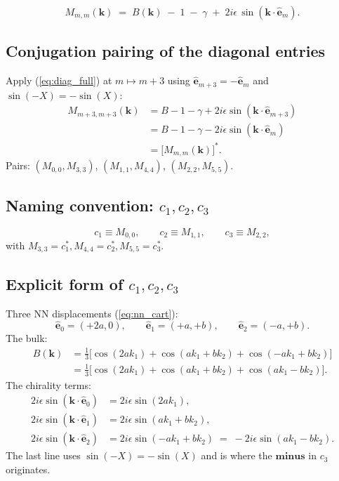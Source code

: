 \documentclass[11pt,a4paper]{article}
\newcommand{\nn}{\nonumber \\}
\newcommand{\vk}{\mathbf{k}}
\newcommand{\veps}[1]{\hat{\mathbf{e}}_{#1}}
\begin{document}
\begin{correctbox}
\begin{equation}\label{eq:diag_full}
M_{m,m}(\vk) \;=\; B(\vk) \;-\; 1 \;-\; \gamma \;+\; 2 i \epsilon \, \sin(\vk \cdot \veps{m}).
\end{equation}
\end{correctbox}

\subsection{Conjugation pairing of the diagonal entries}\label{ssec:conjugation}

Apply (\ref{eq:diag_full}) at $m \mapsto m + 3$ using $\veps{m+3} = -\veps{m}$ and $\sin(-X) = -\sin(X)$:
\begin{align}
M_{m+3, m+3}(\vk) &= B - 1 - \gamma + 2 i \epsilon \sin(\vk \cdot \veps{m+3}) \nn
&= B - 1 - \gamma - 2 i \epsilon \sin(\vk \cdot \veps{m}) \nn
&= \big[M_{m, m}(\vk)\big]^{*}.
\label{eq:conjugation_pair}
\end{align}
Pairs: $(M_{0,0}, M_{3,3})$, $(M_{1,1}, M_{4,4})$, $(M_{2,2}, M_{5,5})$.

\subsection{Naming convention: $c_1, c_2, c_3$}\label{ssec:cnames}
\[
c_1 \equiv M_{0,0}, \qquad c_2 \equiv M_{1,1}, \qquad c_3 \equiv M_{2,2},
\]
with $M_{3,3} = c_1^*, M_{4,4} = c_2^*, M_{5,5} = c_3^*$.

\subsection{Explicit form of $c_1, c_2, c_3$}\label{ssec:c_explicit}

Three NN displacements (\ref{eq:nn_cart}):
\[
\veps{0} = (+2a, 0), \qquad \veps{1} = (+a, +b), \qquad \veps{2} = (-a, +b).
\]
The bulk:
\begin{align}\label{eq:bulk_explicit}
B(\vk) &= \tfrac{1}{3}\big[\cos(2 a k_1) + \cos(a k_1 + b k_2) + \cos(-a k_1 + b k_2)\big] \nn
&= \tfrac{1}{3}\big[\cos(2 a k_1) + \cos(a k_1 + b k_2) + \cos(a k_1 - b k_2)\big].
\end{align}
The chirality terms:
\begin{align}
2 i \epsilon \sin(\vk \cdot \veps{0}) &= 2 i \epsilon \sin(2 a k_1), \\
2 i \epsilon \sin(\vk \cdot \veps{1}) &= 2 i \epsilon \sin(a k_1 + b k_2), \\
2 i \epsilon \sin(\vk \cdot \veps{2}) &= 2 i \epsilon \sin(-a k_1 + b k_2) \;=\; -2 i \epsilon \sin(a k_1 - b k_2).
\label{eq:chirality_m2}
\end{align}
The last line uses $\sin(-X) = -\sin(X)$ and is where the $\textbf{minus}$ in $c_3$ originates.
\end{document}
